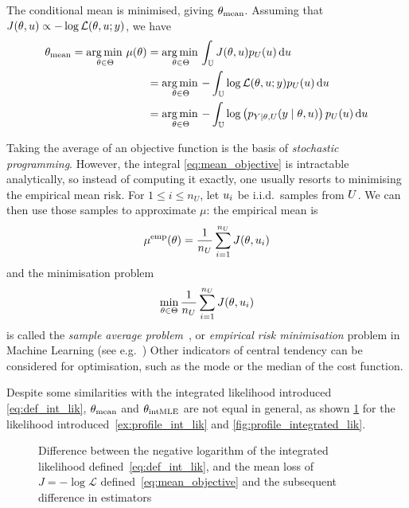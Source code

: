 \documentclass[../../Main_ManuscritThese.tex]{subfiles}
\newcommand\imgpath{/home/victor/acadwriting/Manuscrit/Text/Chapter3/img/}
\begin{document}
The conditional mean is minimised, giving
${\theta}_{\mathrm{mean}}$. Assuming that
$J(\theta, u) \propto - \log \mathcal{L}(\theta,u;y)$, we have
\begin{align}
  {\theta}_{\mathrm{mean}} = \operatorname*{arg\,min \,}_{\theta\in\Theta} \mu(\theta)&= \operatorname*{arg\,min \,}_{\theta\in\Theta}\int_{\mathbb{U}} J(\theta,u) p_{U}(u)\,\mathrm{d}u \\
                                                            &= \operatorname*{arg\,min \,}_{\theta\in\Theta} - \int_{\mathbb{U}} \log \mathcal{L}(\theta,u;y) p_{U}(u)\,\mathrm{d}u \\
                                                            &= \operatorname*{arg\,min \,}_{\theta\in\Theta} - \int_{\mathbb{U}}\log\left(p_{Y \mid \theta,U}(y \mid \theta,u)\right)p_{U}(u)\,\mathrm{d}u 
\end{align}

Taking the average of an objective function is the basis of
\emph{stochastic programming}.  However, the integral
\cref{eq:mean_objective} is intractable analytically, so instead of
computing it exactly, one usually resorts to minimising the empirical
mean risk. For $1\leq i \leq n_U$, let $u_i$ be i.i.d.\ samples from
$U$. We can then use those samples to approximate $\mu$: the
empirical mean is
\begin{equation}
  \label{eq:emp_mean_objective}
  \mu^{\mathrm{emp}}(\theta) = \frac{1}{n_U}\sum_{i=1}^{n_U} J(\theta, u_i)
\end{equation}
and the minimisation problem
\begin{equation}
  \min_{\theta\in\Theta} \frac{1}{n_U}\sum_{i=1}^{n_U} J(\theta, u_i)
\end{equation}
is called the \emph{sample average
  problem}~\cite{juditsky_stochastic_2009}, or \emph{empirical risk
  minimisation} problem in Machine Learning (see
e.g.~\cite{vapnik_principles_1992}) Other indicators of central
tendency can be considered for optimisation, such as the mode or the
median of the cost function.

Despite some similarities with the integrated likelihood introduced
\cref{eq:def_int_lik}, ${\theta}_{\mathrm{mean}}$ and
${\theta}_{\mathrm{intMLE}}$ are not equal in general, as shown
\cref{fig:difference_arithmetic_geometric_mean} for the likelihood
introduced~\cref{ex:profile_int_lik} and
\cref{fig:profile_integrated_lik}.

\begin{figure}[ht]
  \centering
  
  \caption[Difference between integrated likelihood and mean loss]{\label{fig:difference_arithmetic_geometric_mean} Difference between the negative logarithm of the integrated likelihood defined~\cref{eq:def_int_lik}, and the mean loss of $J = -\log \mathcal{L}$ defined~\cref{eq:mean_objective} and the subsequent difference in estimators}
\end{figure}
\end{document}
